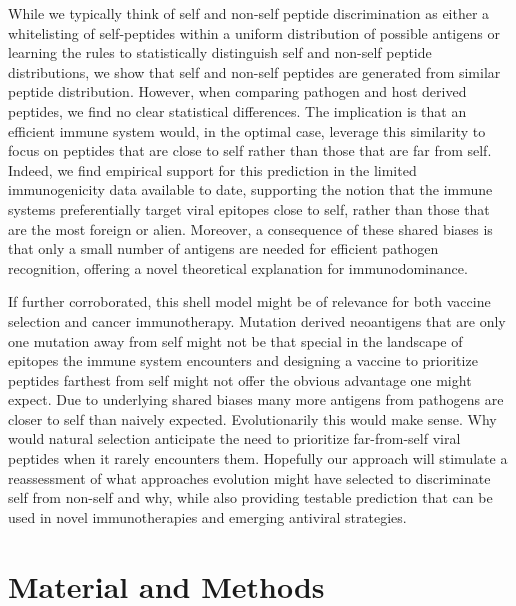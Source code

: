 \documentclass[superscriptaddress,twocolumn,pre]{revtex4}
\newcommand{\<}{\langle}
\renewcommand{\>}{\rangle}
\begin{document}
While we typically think of self and non-self peptide discrimination as either a whitelisting of self-peptides within a uniform distribution of possible antigens or learning the rules to statistically distinguish self and non-self peptide distributions, we show that self and non-self peptides are generated from similar peptide distribution. However, when comparing pathogen and host derived peptides, we find no clear statistical differences. The implication is that an efficient immune system would, in the optimal case, leverage this similarity to focus on peptides that are close to self rather than those that are far from self. Indeed, we find empirical support for this prediction in the limited immunogenicity data available to date, supporting the notion that the immune systems preferentially target viral epitopes close to self, rather than those that are the most foreign or alien. Moreover, a consequence of these shared biases is that only a small number of antigens are needed for efficient pathogen recognition, offering a novel theoretical explanation for immunodominance.

If further corroborated, this shell model might be of relevance for both vaccine selection and cancer immunotherapy. Mutation derived neoantigens that are only one mutation away from self might not be that special in the landscape of epitopes the immune system encounters and designing a vaccine to prioritize peptides farthest from self might not offer the obvious advantage one might expect. Due to underlying shared biases many more antigens from pathogens are closer to self than naively expected. Evolutionarily this would make sense. Why would natural selection anticipate the need to prioritize far-from-self viral peptides when it rarely encounters them. Hopefully our approach will stimulate a reassessment of what approaches evolution might have selected to discriminate self from non-self and why, while also providing testable prediction that can be used in novel immunotherapies and emerging antiviral strategies.

\section{Material and Methods}
\end{document}
